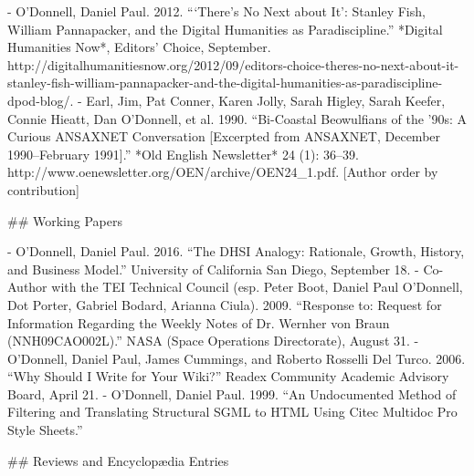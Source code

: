- O’Donnell, Daniel Paul. 2012. “‘There’s No Next about It’: Stanley Fish, William Pannapacker, and the Digital Humanities as Paradiscipline.” *Digital Humanities Now*, Editors’ Choice, September. http:/\allowbreak{}/\allowbreak{}digitalhumanitiesnow.org/\allowbreak{}2012/\allowbreak{}09/\allowbreak{}editors-choice-theres-no-next-about-it-stanley-fish-william-pannapacker-and-the-digital-humanities-as-paradiscipline-dpod-blog/\allowbreak{}.
- Earl, Jim, Pat Conner, Karen Jolly, Sarah Higley, Sarah Keefer, Connie Hieatt, Dan O’Donnell\*, et al. 1990. “Bi-Coastal Beowulfians of the ’90s: A Curious ANSAXNET Conversation [Excerpted from ANSAXNET, December 1990–February 1991].” *Old English Newsletter* 24 (1): 36–39. http:/\allowbreak{}/\allowbreak{}www.oenewsletter.org/\allowbreak{}OEN/\allowbreak{}archive/\allowbreak{}OEN24_1.pdf. [Author order by contribution]

\sectionbreak{}
## Working Papers

- O’Donnell, Daniel Paul. 2016. “The DHSI Analogy: Rationale, Growth, History, and Business Model.” University of California San Diego, September 18.
- Co-Author with the TEI Technical Council (esp. Peter Boot, Daniel Paul O'Donnell, Dot Porter, Gabriel Bodard, Arianna Ciula). 2009. “Response to: Request for Information Regarding the Weekly Notes of Dr. Wernher von Braun (NNH09CAO002L).” NASA (Space Operations Directorate), August 31.
- O'Donnell, Daniel Paul, James Cummings, and Roberto Rosselli Del Turco. 2006. “Why Should I Write for Your Wiki?” Readex Community Academic Advisory Board, April 21.
- O'Donnell, Daniel Paul. 1999. “An Undocumented Method of Filtering and Translating Structural SGML to HTML Using Citec Multidoc Pro Style Sheets.”

\sectionbreak{}
## Reviews and Encyclopædia Entries

